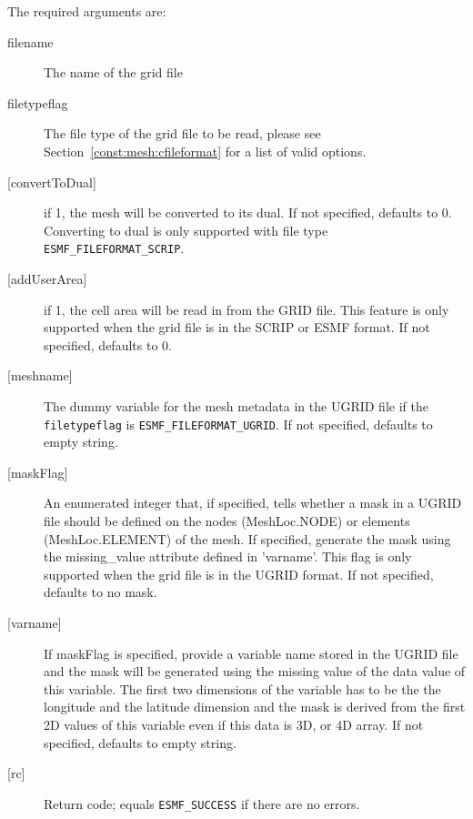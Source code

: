     The required arguments are:
    \begin{description}
     \item [filename]
           The name of the grid file
     \item[filetypeflag]
           The file type of the grid file to be read, please see Section~\ref{const:mesh:cfileformat}
           for a list of valid options.
     \item[{[convertToDual]}]
           if 1, the mesh will be converted to its dual. If not specified,
           defaults to 0. Converting to dual is only supported with
           file type {\tt ESMF\_FILEFORMAT\_SCRIP}.
     \item[{[addUserArea]}]
           if 1, the cell area will be read in from the GRID file.  This feature is
           only supported when the grid file is in the SCRIP or ESMF format. If not specified,
           defaults to 0.
     \item[{[meshname]}]
           The dummy variable for the mesh metadata in the UGRID file if the {\tt filetypeflag}
           is {\tt ESMF\_FILEFORMAT\_UGRID}.  If not specified, defaults to empty string.
     \item[{[maskFlag]}]
           An enumerated integer that, if specified, tells whether a mask in
           a UGRID file should be defined on the nodes (MeshLoc.NODE) or
           elements (MeshLoc.ELEMENT) of the mesh.  If specified, generate
           the mask using the missing\_value attribute defined in 'varname'.
           This flag is only supported when the grid file is in the UGRID
           format.  If not specified, defaults to no mask.
     \item[{[varname]}]
           If maskFlag is specified, provide a variable name stored in the UGRID file and
           the mask will be generated using the missing value of the data value of
           this variable.  The first two dimensions of the variable has to be the
           the longitude and the latitude dimension and the mask is derived from the
           first 2D values of this variable even if this data is 3D, or 4D array. If not
           specified, defaults to empty string.
     \item [{[rc]}]
           Return code; equals {\tt ESMF\_SUCCESS} if there are no errors.
    \end{description}
   
 
\mbox{}\hrulefill\ 
 

